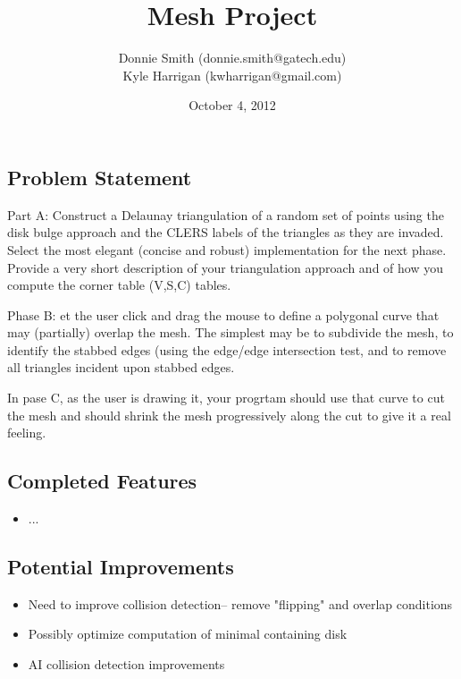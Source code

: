 \documentclass[a4paper,twocolumn]{article}
\title{Mesh Project}
\author{
Donnie Smith (donnie.smith@gatech.edu) \\
Kyle Harrigan (kwharrigan@gmail.com) 
}
\date{October 4, 2012}                                           %
\begin{document}
\maketitle

%


 \subsection*{Problem Statement}
 
Part A: Construct a Delaunay triangulation of a random set of points using the disk bulge approach and the CLERS labels of the triangles as they are invaded.  Select the most elegant (concise and robust) implementation for the next phase. Provide a very short description of your triangulation approach and of how you compute the corner table (V,S,C) tables.

Phase B: et the user click and drag the mouse to define a polygonal curve that may (partially) overlap the mesh.
The simplest may be to subdivide the mesh, to identify the stabbed edges (using the edge/edge intersection test, and to remove all triangles incident upon stabbed edges.

In pase C, as the user is drawing it, your progrtam should use that curve to cut the mesh and should shrink the mesh progressively along the cut to give it a real feeling.
 
 \subsection*{Completed Features}
 \begin{multicols}{2}
 \begin{itemize}
 \setlength\multicolsep{0pt}
\itemsep0em 
\item ...
\end{itemize}
\end{multicols}

 \subsection*{Potential Improvements}
  \begin{multicols}{2}
 \begin{itemize}
\item Need to improve collision detection-- remove "flipping" and overlap conditions
\item Possibly optimize computation of minimal containing disk
\item AI collision detection improvements
\end{itemize}
\end{multicols}
 
\end{document}
